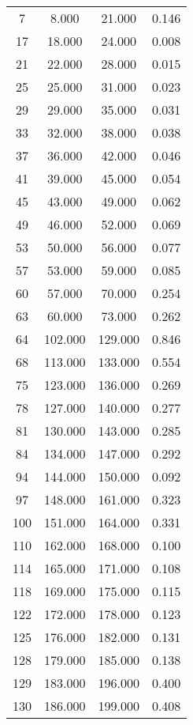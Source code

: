 % 
\begin{tabular}{cccc}
  \hline
  \hline
7 & 8.000 & 21.000 & 0.146 \\ 
  17 & 18.000 & 24.000 & 0.008 \\ 
  21 & 22.000 & 28.000 & 0.015 \\ 
  25 & 25.000 & 31.000 & 0.023 \\ 
  29 & 29.000 & 35.000 & 0.031 \\ 
  33 & 32.000 & 38.000 & 0.038 \\ 
  37 & 36.000 & 42.000 & 0.046 \\ 
  41 & 39.000 & 45.000 & 0.054 \\ 
  45 & 43.000 & 49.000 & 0.062 \\ 
  49 & 46.000 & 52.000 & 0.069 \\ 
  53 & 50.000 & 56.000 & 0.077 \\ 
  57 & 53.000 & 59.000 & 0.085 \\ 
  60 & 57.000 & 70.000 & 0.254 \\ 
  63 & 60.000 & 73.000 & 0.262 \\ 
  64 & 102.000 & 129.000 & 0.846 \\ 
  68 & 113.000 & 133.000 & 0.554 \\ 
  75 & 123.000 & 136.000 & 0.269 \\ 
  78 & 127.000 & 140.000 & 0.277 \\ 
  81 & 130.000 & 143.000 & 0.285 \\ 
  84 & 134.000 & 147.000 & 0.292 \\ 
  94 & 144.000 & 150.000 & 0.092 \\ 
  97 & 148.000 & 161.000 & 0.323 \\ 
  100 & 151.000 & 164.000 & 0.331 \\ 
  110 & 162.000 & 168.000 & 0.100 \\ 
  114 & 165.000 & 171.000 & 0.108 \\ 
  118 & 169.000 & 175.000 & 0.115 \\ 
  122 & 172.000 & 178.000 & 0.123 \\ 
  125 & 176.000 & 182.000 & 0.131 \\ 
  128 & 179.000 & 185.000 & 0.138 \\ 
  129 & 183.000 & 196.000 & 0.400 \\ 
  130 & 186.000 & 199.000 & 0.408 \\ 
   \hline
\end{tabular}
